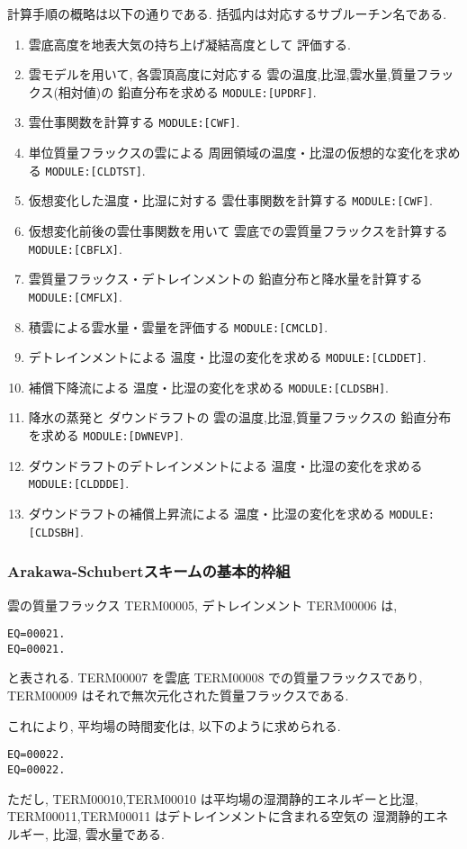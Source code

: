 計算手順の概略は以下の通りである.
括弧内は対応するサブルーチン名である.
%
\begin{enumerate}
\item 雲底高度を地表大気の持ち上げ凝結高度として
      評価する.
\item 雲モデルを用いて, 
      各雲頂高度に対応する
      雲の温度,比湿,雲水量,質量フラックス(相対値)の
      鉛直分布を求める \texttt{MODULE:[UPDRF]}.
\item 雲仕事関数を計算する \texttt{MODULE:[CWF]}.
\item 単位質量フラックスの雲による
      周囲領域の温度・比湿の仮想的な変化を求める \texttt{MODULE:[CLDTST]}.
\item 仮想変化した温度・比湿に対する
      雲仕事関数を計算する \texttt{MODULE:[CWF]}.
\item 仮想変化前後の雲仕事関数を用いて
      雲底での雲質量フラックスを計算する \texttt{MODULE:[CBFLX]}.
\item 雲質量フラックス・デトレインメントの
      鉛直分布と降水量を計算する \texttt{MODULE:[CMFLX]}.
\item 積雲による雲水量・雲量を評価する \texttt{MODULE:[CMCLD]}.
\item デトレインメントによる
      温度・比湿の変化を求める \texttt{MODULE:[CLDDET]}.
\item 補償下降流による
      温度・比湿の変化を求める \texttt{MODULE:[CLDSBH]}.
\item 降水の蒸発と
      ダウンドラフトの
      雲の温度,比湿,質量フラックスの
      鉛直分布を求める \texttt{MODULE:[DWNEVP]}.
\item ダウンドラフトのデトレインメントによる
      温度・比湿の変化を求める \texttt{MODULE:[CLDDDE]}.      
\item ダウンドラフトの補償上昇流による
      温度・比湿の変化を求める \texttt{MODULE:[CLDSBH]}.
\end{enumerate}

\subsubsection{Arakawa-Schubertスキームの基本的枠組}

雲の質量フラックス TERM00005, デトレインメント TERM00006 は, 
\begin{verbatim}
EQ=00021.
EQ=00021.
\end{verbatim}
と表される. 
TERM00007 を雲底 TERM00008 での質量フラックスであり,
TERM00009 はそれで無次元化された質量フラックスである.

これにより, 平均場の時間変化は, 以下のように求められる.
\begin{verbatim}
EQ=00022.
EQ=00022.
\end{verbatim}
ただし, TERM00010,TERM00010 は平均場の湿潤静的エネルギーと比湿,
TERM00011,TERM00011 はデトレインメントに含まれる空気の
湿潤静的エネルギー, 比湿, 雲水量である.

